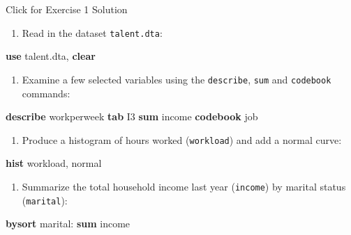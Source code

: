 \documentclass[
]{book}
\newenvironment{Shaded}{\begin{snugshade}}{\end{snugshade}}
\newcommand{\FunctionTok}[1]{\textcolor[rgb]{0.00,0.00,0.00}{#1}}
\newcommand{\KeywordTok}[1]{\textcolor[rgb]{0.13,0.29,0.53}{\textbf{#1}}}
\newcommand{\NormalTok}[1]{#1}
\providecommand{\tightlist}{%
  \setlength{\itemsep}{0pt}\setlength{\parskip}{0pt}}
\begin{document}
{Click for Exercise 1 Solution}

\begin{enumerate}
\def\labelenumi{\arabic{enumi}.}
\tightlist
\item
  Read in the dataset \texttt{talent.dta}:
\end{enumerate}

\begin{Shaded}
\begin{Highlighting}[]
\KeywordTok{use}\NormalTok{ talent.dta, }\KeywordTok{clear}
\end{Highlighting}
\end{Shaded}

\begin{enumerate}
\def\labelenumi{\arabic{enumi}.}
\setcounter{enumi}{1}
\tightlist
\item
  Examine a few selected variables using the \texttt{describe}, \texttt{sum} and \texttt{codebook} commands:
\end{enumerate}

\begin{Shaded}
\begin{Highlighting}[]
\KeywordTok{describe}\NormalTok{ workperweek}
\KeywordTok{tab}\NormalTok{ I3}
\KeywordTok{sum}\NormalTok{ income}
\KeywordTok{codebook}\NormalTok{ job}
\end{Highlighting}
\end{Shaded}

\begin{enumerate}
\def\labelenumi{\arabic{enumi}.}
\setcounter{enumi}{2}
\tightlist
\item
  Produce a histogram of hours worked (\texttt{workload}) and add a normal curve:
\end{enumerate}

\begin{Shaded}
\begin{Highlighting}[]
\KeywordTok{hist}\NormalTok{ workload, }\FunctionTok{normal} 
\end{Highlighting}
\end{Shaded}

\begin{enumerate}
\def\labelenumi{\arabic{enumi}.}
\setcounter{enumi}{3}
\tightlist
\item
  Summarize the total household income last year (\texttt{income}) by marital status (\texttt{marital}):
\end{enumerate}

\begin{Shaded}
\begin{Highlighting}[]
\KeywordTok{bysort}\NormalTok{ marital: }\KeywordTok{sum}\NormalTok{ income}
\end{Highlighting}
\end{Shaded}
\end{document}
